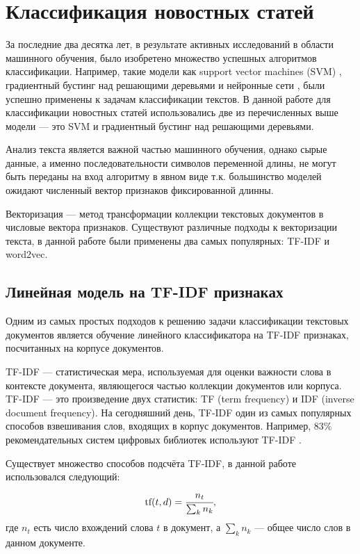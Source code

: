 \documentclass[a4paper, 14pt]{extarticle}
\begin{document}
\section{Классификация новостных статей}
За последние два десятка лет, в результате активных исследований в области машинного обучения,
было изобретено множество успешных алгоритмов классификации. Например, такие модели как support vector machines (SVM) \cite{weston99svms},
градиентный бустинг над решающими деревьями и нейронные сети \cite{DBLP:journals/corr/ConneauSBL16}, были успешно применены к задачам классификации текстов.
В данной работе для классификации новостных статей использовались две из перечисленных выше модели --- это SVM и градиентный бустинг
над решающими деревьями.

Анализ текста является важной частью машинного обучения, однако сырые данные, а именно последовательности символов переменной длины,
не могут быть переданы на вход алгоритму в явном виде т.к. большинство моделей ожидают численный вектор признаков фиксированной длинны.

Векторизация --- метод трансформации коллекции текстовых документов в числовые вектора признаков.
Существуют различные подходы к векторизации текста, в данной работе были применены два самых популярных: TF-IDF и word2vec.

\subsection{Линейная модель на TF-IDF признаках}
Одним из самых простых подходов к решению задачи классификации текстовых документов является обучение линейного классификатора на
TF-IDF признаках, посчитанных на корпусе документов.

TF-IDF \cite{doi:10.1108/eb026526} --- статистическая мера, используемая для оценки важности слова в контексте 
документа, являющегося частью коллекции документов или корпуса.
TF-IDF --- это произведение двух статистик: TF (term frequency) и IDF (inverse 
document frequency). На сегодняшний день, TF-IDF один из самых популярных способов взвешивания слов, входящих в корпус документов.
Например, 83\% рекомендательных систем цифровых библиотек используют TF-IDF \cite{Beel2016}.

Существует множество способов подсчёта TF-IDF, в данной работе использовался следующий:
$$
\text{tf}(t, d) = \cfrac{n_t}{\sum_{k} n_k},
$$
где $n_{t}$ есть число вхождений слова $t$ в документ, а $\sum_{k} n_k$ --- общее число слов в данном документе.
\end{document}
